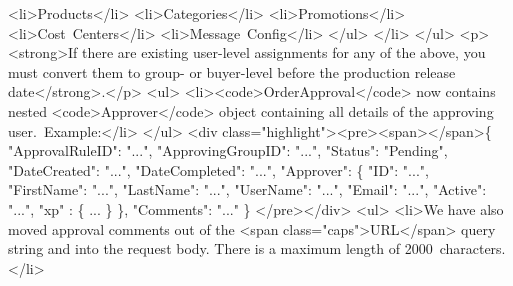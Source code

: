 \documentclass{memoir}%
\begin{document}
<li>Products</li>\newline%
<li>Categories</li>\newline%
<li>Promotions</li>\newline%
<li>Cost~Centers</li>\newline%
<li>Message~Config</li>\newline%
</ul>\newline%
</li>\newline%
</ul>\newline%
<p><strong>If there are existing user{-}level assignments for any of the above, you must convert them to group{-} or buyer{-}level before the production release date</strong>.</p>\newline%
<ul>\newline%
<li><code>OrderApproval</code> now contains nested <code>Approver</code> object containing all details of the approving user.~Example:</li>\newline%
</ul>\newline%
<div class="highlight"><pre><span></span>\{\newline%
    "ApprovalRuleID": "...",\newline%
    "ApprovingGroupID": "...",\newline%
    "Status": "Pending",\newline%
    "DateCreated": "...",\newline%
    "DateCompleted": "...",\newline%
    "Approver":\newline%
    \{\newline%
        "ID": "...",\newline%
        "FirstName": "...",\newline%
        "LastName": "...",\newline%
        "UserName": "...",\newline%
        "Email": "...",\newline%
        "Active": "...",\newline%
        "xp" : \{ ... \}\newline%
    \},\newline%
    "Comments": "..."\newline%
\}\newline%
</pre></div>\newline%
<ul>\newline%
<li>We have also moved approval comments out of the <span class="caps">URL</span> query string and into the request body. There is a maximum length of 2000~characters.</li>\newline%
\end{document}

